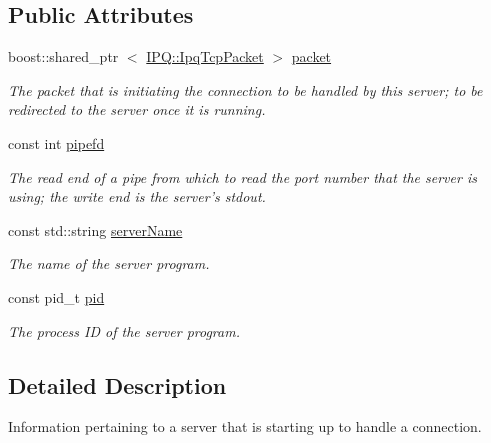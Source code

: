 \subsection*{\-Public \-Attributes}
\begin{DoxyCompactItemize}
\item 
boost\-::shared\-\_\-ptr\*
$<$ \hyperlink{classIPQ_1_1IpqTcpPacket}{\-I\-P\-Q\-::\-Ipq\-Tcp\-Packet} $>$ \hyperlink{structNERD_1_1ConnectionServer_1_1PendingConnection_ad536775b738bdf1f819d7ad416214b71}{packet}
\begin{DoxyCompactList}\small\item\em \-The packet that is initiating the connection to be handled by this server; to be redirected to the server once it is running. \end{DoxyCompactList}\item 
const int \hyperlink{structNERD_1_1ConnectionServer_1_1PendingConnection_a227bb11370e616eab7eb9a67b4cdf4ca}{pipefd}
\begin{DoxyCompactList}\small\item\em \-The read end of a pipe from which to read the port number that the server is using; the write end is the server's stdout. \end{DoxyCompactList}\item 
const std\-::string \hyperlink{structNERD_1_1ConnectionServer_1_1PendingConnection_aa6bf63096cc00bffa641e31867cec98d}{server\-Name}
\begin{DoxyCompactList}\small\item\em \-The name of the server program. \end{DoxyCompactList}\item 
const pid\-\_\-t \hyperlink{structNERD_1_1ConnectionServer_1_1PendingConnection_a7a98b508720b6c7bc1f2028c3b2696d5}{pid}
\begin{DoxyCompactList}\small\item\em \-The process \-I\-D of the server program. \end{DoxyCompactList}\end{DoxyCompactItemize}


\subsection{\-Detailed \-Description}
\-Information pertaining to a server that is starting up to handle a connection. 

